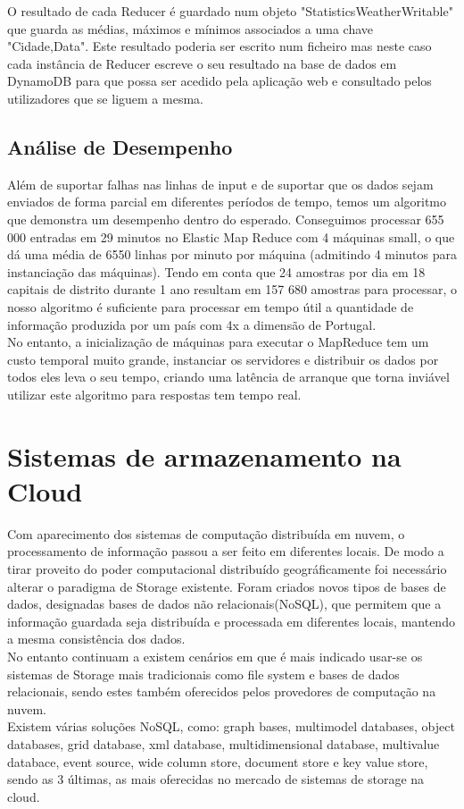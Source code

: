 O resultado de cada Reducer é guardado num objeto "StatisticsWeatherWritable" que guarda as médias, máximos e mínimos associados a uma chave "Cidade,Data". Este resultado poderia ser escrito num ficheiro mas neste caso cada instância de Reducer escreve o seu resultado na base de dados em DynamoDB para que possa ser acedido pela aplicação web e consultado pelos utilizadores que se liguem a mesma.\\


\subsection{Análise de Desempenho}
Além de suportar falhas nas linhas de input e de suportar que os dados sejam enviados de forma parcial em diferentes períodos de tempo, temos um algoritmo que demonstra um desempenho dentro do esperado. Conseguimos processar 655 000 entradas em 29 minutos no Elastic Map Reduce com 4 máquinas small, o que dá uma média de 6550 linhas por minuto por máquina (admitindo 4 minutos para instanciação das máquinas). Tendo em conta que 24 amostras por dia em 18 capitais de distrito durante 1 ano resultam em 157 680 amostras para processar, o nosso algoritmo é suficiente para processar em tempo útil a quantidade de informação produzida por um país com 4x a dimensão de Portugal.\\
No entanto, a inicialização de máquinas para executar o MapReduce tem um custo temporal muito grande, instanciar os servidores e distribuir os dados por todos eles leva o seu tempo, criando uma latência de arranque que torna inviável utilizar este algoritmo para respostas tem tempo real.

\section{Sistemas de armazenamento na Cloud}
	Com aparecimento dos sistemas de computação distribuída em nuvem, o processamento de informação passou a ser feito em diferentes locais. De modo a tirar proveito do poder computacional distribuído geográficamente foi necessário alterar o paradigma de Storage existente. Foram criados novos tipos de bases de dados, designadas  bases de dados não relacionais(NoSQL), que permitem que a informação guardada seja distribuída e processada em diferentes locais, mantendo a mesma consistência dos dados. \\
	No entanto continuam a existem cenários em que é mais indicado usar-se os sistemas de Storage mais tradicionais como file system e bases de dados relacionais, sendo estes também oferecidos pelos provedores de computação na nuvem.\\
	Existem várias soluções NoSQL, como: graph bases, multimodel databases, object databases, grid database, xml database, multidimensional database, multivalue databace, event source, wide column store, document store e key value store, sendo as  3 últimas, as mais oferecidas no mercado de sistemas de storage na cloud.\\


